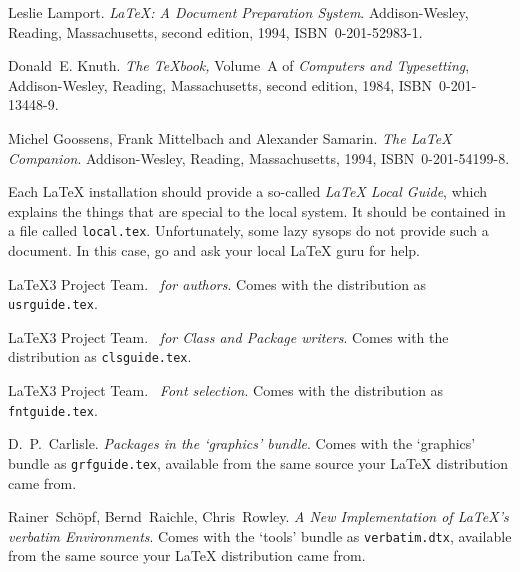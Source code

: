 \begin{thebibliography}{99}
 Leslie Lamport.  \newblock \emph{{\LaTeX:} A Document
    Preparation System}.  \newblock Addison-Wesley, Reading,
  Massachusetts, second edition, 1994, ISBN~0-201-52983-1.
  
 Donald~E. Knuth.  \newblock \textit{The \TeX{}book,}
  Volume~A of \textit{Computers and Typesetting}, Addison-Wesley,
  Reading, Massachusetts, second edition, 1984, ISBN~0-201-13448-9.

 Michel Goossens, Frank Mittelbach and Alexander
  Samarin.  \newblock \emph{The {\LaTeX} Companion}.  \newblock
  Addison-Wesley, Reading, Massachusetts, 1994, ISBN~0-201-54199-8.
 
 Each \LaTeX{} installation should provide a so-called
  \emph{\LaTeX{} Local Guide}, which explains the things that are
  special to the local system.  It should be contained in a file called
  \texttt{local.tex}. Unfortunately, some lazy sysops do not provide such a
  document. In this case, go and ask your local \LaTeX{} guru for help.
 
 \LaTeX3 Project Team.  \newblock \emph{\LaTeXe~for
    authors}.  \newblock Comes with the \LaTeXe{} distribution as
  \texttt{usrguide.tex}.

 \LaTeX3 Project Team.  \newblock \emph{\LaTeXe~for
    Class and Package writers}.  \newblock Comes with the \LaTeXe{}
  distribution as \texttt{clsguide.tex}.

 \LaTeX3 Project Team.  \newblock \emph{\LaTeXe~Font
    selection}.  \newblock Comes with the \LaTeXe{} distribution as
  \texttt{fntguide.tex}.

 D.~P.~Carlisle.  \newblock \emph{Packages in the
    `graphics' bundle}.  \newblock Comes with the `graphics' bundle as
  \texttt{grfguide.tex}, available from the same source your \LaTeX{}
  distribution came from.

 Rainer~Sch\"opf, Bernd~Raichle, Chris~Rowley.  
\newblock \emph{A New Implementation of \LaTeX's verbatim
  Environments}.
 \newblock Comes with the `tools' bundle as
  \texttt{verbatim.dtx}, available from the same source your \LaTeX{}
  distribution came from. 


\end{thebibliography}
